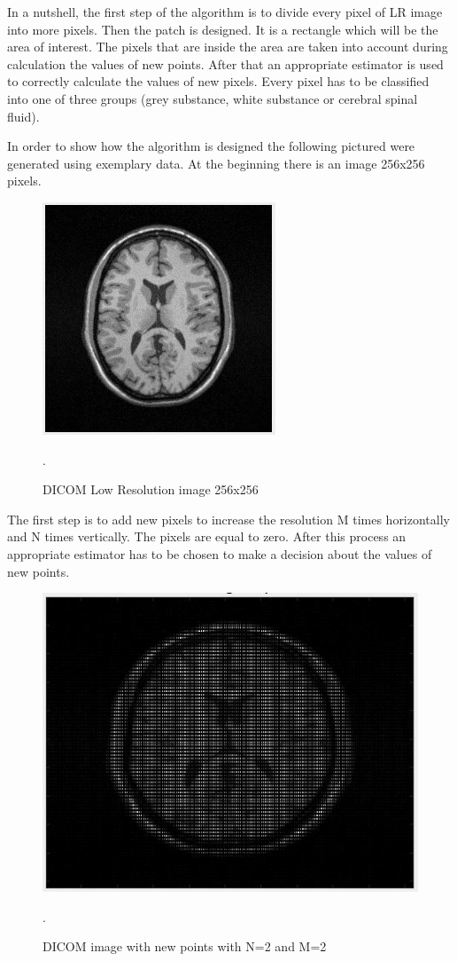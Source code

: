 \begin{enumerate}
In a nutshell, the first step of the algorithm is to divide every pixel of LR image into more pixels. Then the patch is designed. It is a rectangle which will be the area of interest. The pixels that are inside the area are taken into account during calculation the values of new points.
After that an appropriate estimator is used to correctly calculate the values of new pixels. Every pixel has to be classified into one of three groups (grey substance, white substance or cerebral spinal fluid).

In order to show how the algorithm is designed the following pictured were generated using exemplary data. At the beginning there is an image 256x256 pixels. 

\begin{figure}[H]
\centering{}\includegraphics[scale=0.7]{figures/Module_10/Module10_2}\caption{DICOM Low Resolution image 256x256}. 
\label{fig: Module9_2}
\end{figure}

The first step is to add new pixels to increase the resolution M times horizontally and N times vertically. The pixels are equal to zero. After this process an appropriate estimator has to be chosen to make a decision about the values of new points.

\begin{figure}[H]
\centering{}\includegraphics[scale=0.5]{figures/Module_10/Module10_3}\caption{DICOM image with new points with N=2 and M=2}. 
\label{fig: Module9_3}
\end{figure}


\end{enumerate}
